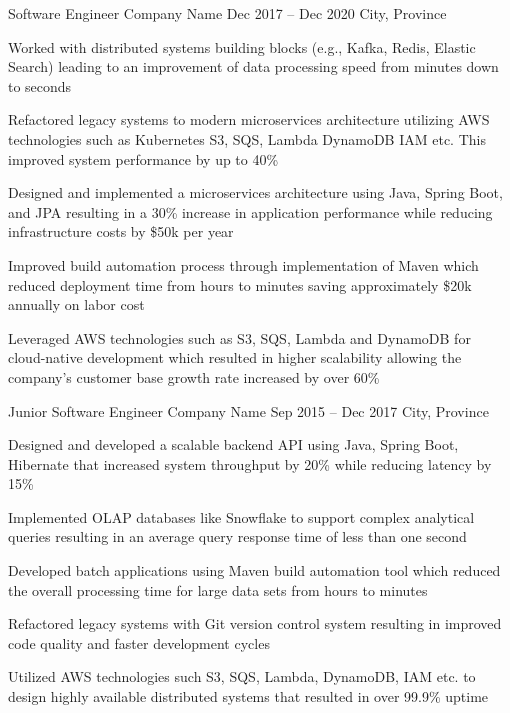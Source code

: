 \documentclass[letterpaper]{resume_config}
\begin{document}
\WorkExperience
    {Software Engineer} %
    {Company Name} %
    {Dec 2017 -- Dec 2020} %
    {City, Province} %
    {
        \item Worked with distributed systems building blocks (e.g., Kafka, Redis, Elastic Search) leading to an improvement of data processing speed from minutes down to seconds
        \item Refactored legacy systems to modern microservices architecture utilizing AWS technologies such as Kubernetes S3, SQS, Lambda DynamoDB IAM etc. This improved system performance by up to 40\%
        \item Designed and implemented a microservices architecture using Java, Spring Boot, and JPA resulting in a 30\% increase in application performance while reducing infrastructure costs by \$50k per year
        \item Improved build automation process through implementation of Maven which reduced deployment time from hours to minutes saving approximately \$20k annually on labor cost
        \item Leveraged AWS technologies such as S3, SQS, Lambda and DynamoDB for cloud-native development which resulted in higher scalability allowing the company's customer base growth rate increased by over 60\%
    }

\WorkExperience
    {Junior Software Engineer} %
    {Company Name} %
    {Sep 2015 -- Dec 2017} %
    {City, Province} %
    {
        \item Designed and developed a scalable backend API using Java, Spring Boot, Hibernate that increased system throughput by 20\% while reducing latency by 15\%
        \item Implemented OLAP databases like Snowflake to support complex analytical queries resulting in an average query response time of less than one second
        \item Developed batch applications using Maven build automation tool which reduced the overall processing time for large data sets from hours to minutes
        \item Refactored legacy systems with Git version control system resulting in improved code quality and faster development cycles
        \item Utilized AWS technologies such S3, SQS, Lambda, DynamoDB, IAM etc. to design highly available distributed systems that resulted in over 99.9\% uptime
    }
\end{document}

